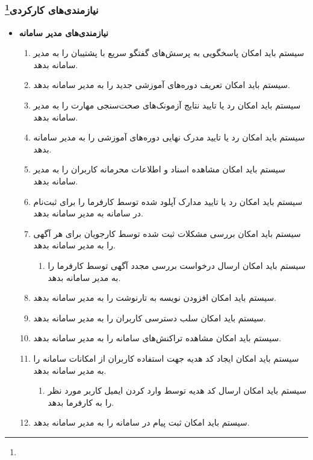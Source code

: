 \documentclass[12pt]{article}
\begin{document}
	\subsubsection{نیازمندی‌های کارکردی\footnote{}}
	\begin{itemize}
		\item
		\textbf{نیازمندی‌های مدیر سامانه}
		\begin{enumerate}
			\renewcommand{\labelenumi}{-R\arabic{enumi}}
			\item سیستم باید امکان پاسخگویی به پرسش‌های گفتگو سریع با پشتیبان را به مدیر سامانه بدهد.
			\item سیستم باید امکان تعریف دوره‌های آموزشی جدید را به مدیر سامانه بدهد.
			\item سیستم باید امکان رد یا تایید نتایج آزمونک‌های صحت‌سنجی مهارت را به مدیر سامانه بدهد.
			\item سیستم باید امکان رد یا تایید مدرک نهایی دوره‌های آموزشی را به مدیر سامانه بدهد.
			\item سیستم باید امکان مشاهده اسناد و اطلاعات محرمانه کاربران را به مدیر سامانه بدهد.
			\item سیستم باید امکان رد یا تایید مدارک آپلود شده توسط کارفرما را برای ثبت‌نام در سامانه به مدیر سامانه بدهد.
			\item سیستم باید امکان بررسی مشکلات ثبت شده توسط کارجویان برای هر آگهی را به مدیر سامانه بدهد.
			\begin{enumerate}
				\renewcommand{\labelenumii}{-R\arabic{enumi}.\arabic{enumii}}
				\item سیستم باید امکان ارسال درخواست بررسی مجدد آگهی توسط کارفرما را به مدیر سامانه بدهد.
			\end{enumerate}
			\item سیستم باید امکان افزودن نویسه به تارنوشت را به مدیر سامانه بدهد.
			\item سیستم باید امکان سلب دسترسی کاربران را به مدیر سامانه بدهد.
			\item سیستم باید امکان مشاهده تراکنش‌های سامانه را به مدیر سامانه بدهد.
			\item سیستم باید امکان ایجاد کد هدیه جهت استفاده کاربران از امکانات سامانه را به مدیر سامانه بدهد.
			\begin{enumerate}
				\renewcommand{\labelenumii}{-R\arabic{enumi}.\arabic{enumii}}
				\item سیستم باید امکان ارسال کد هدیه توسط وارد کردن ایمیل کاربر مورد نظر را به کارفرما بدهد.
			\end{enumerate}
			\item سیستم باید امکان ثبت پیام در سامانه را به مدیر سامانه بدهد.

\end{enumerate}
\end{itemize}
\end{document}
